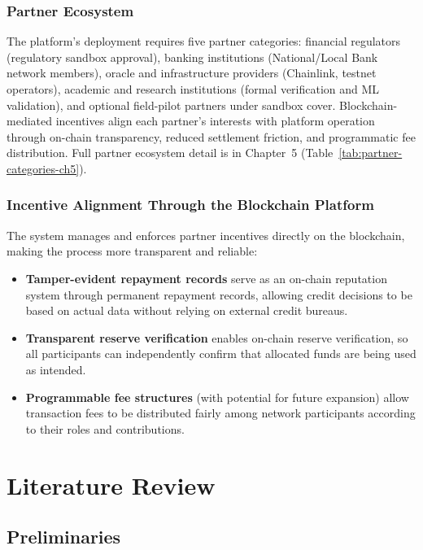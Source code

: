 \documentclass[12pt,a4paper]{report}
\begin{document}
\subsection{Partner Ecosystem}

The platform's deployment requires five partner categories: financial regulators (regulatory sandbox approval), banking institutions (National/Local Bank network members), oracle and infrastructure providers (Chainlink, testnet operators), academic and research institutions (formal verification and ML validation), and optional field-pilot partners under sandbox cover. Blockchain-mediated incentives align each partner's interests with platform operation through on-chain transparency, reduced settlement friction, and programmatic fee distribution. Full partner ecosystem detail is in Chapter~5 (Table~\ref{tab:partner-categories-ch5}).

\subsection{Incentive Alignment Through the Blockchain Platform}

The system manages and enforces partner incentives directly on the blockchain, making the process more transparent and reliable:

\begin{itemize}[noitemsep]
\item \textbf{Tamper-evident repayment records} serve as an on-chain reputation system through permanent repayment records, allowing credit decisions to be based on actual data without relying on external credit bureaus.
\item \textbf{Transparent reserve verification} enables on-chain reserve verification, so all participants can independently confirm that allocated funds are being used as intended.
\item \textbf{Programmable fee structures} (with potential for future expansion) allow transaction fees to be distributed fairly among network participants according to their roles and contributions.
\end{itemize}


\chapter{Literature Review}

\section{Preliminaries}
\end{document}
